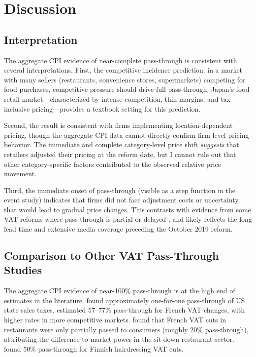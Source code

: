 \documentclass[12pt]{article}
\begin{document}
\section{Discussion}
\label{sec:discussion}

\subsection{Interpretation}

The aggregate CPI evidence of near-complete pass-through is consistent with several interpretations. First, the competitive incidence prediction: in a market with many sellers (restaurants, convenience stores, supermarkets) competing for food purchases, competitive pressure should drive full pass-through. Japan's food retail market---characterized by intense competition, thin margins, and tax-inclusive pricing---provides a textbook setting for this prediction.

Second, the result is consistent with firms implementing location-dependent pricing, though the aggregate CPI data cannot directly confirm firm-level pricing behavior. The immediate and complete category-level price shift \textit{suggests} that retailers adjusted their pricing at the reform date, but I cannot rule out that other category-specific factors contributed to the observed relative price movement.

Third, the immediate onset of pass-through (visible as a step function in the event study) indicates that firms did not face adjustment costs or uncertainty that would lead to gradual price changes. This contrasts with evidence from some VAT reforms where pass-through is partial or delayed \citep{benzarti2020passthrough}, and likely reflects the long lead time and extensive media coverage preceding the October 2019 reform.

\subsection{Comparison to Other VAT Pass-Through Studies}

The aggregate CPI evidence of near-100\% pass-through is at the high end of estimates in the literature. \citet{poterba1996retail} found approximately one-for-one pass-through of US state sales taxes. \citet{carbonnier2007pass} estimated 57--77\% pass-through for French VAT changes, with higher rates in more competitive markets. \citet{benzarti2019really} found that French VAT cuts in restaurants were only partially passed to consumers (roughly 20\% pass-through), attributing the difference to market power in the sit-down restaurant sector. \citet{kosonen2015tax} found 50\% pass-through for Finnish hairdressing VAT cuts.
\end{document}
